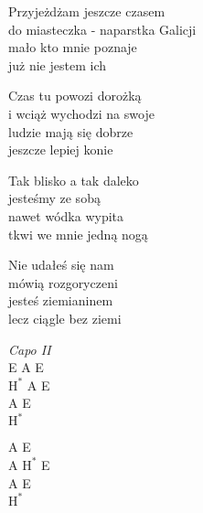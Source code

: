 \begin{text}
    \chordfill
    Przyjeżdżam jeszcze czasem\\
    do miasteczka - naparstka Galicji\\
    mało kto mnie poznaje\\
    już nie jestem ich

    Czas tu powozi dorożką\\
    i wciąż wychodzi na swoje\\
    ludzie mają się dobrze\\
    jeszcze lepiej konie

    Tak blisko a tak daleko\\
    jesteśmy ze sobą\\
    nawet wódka wypita\\
    tkwi we mnie jedną nogą

    Nie udałeś się nam\\
    mówią rozgoryczeni\\
    jesteś ziemianinem\\
    lecz ciągle bez ziemi
\end{text}
\begin{chord}
    \textit{Capo II}\\
    E A E\\
    $\mathrm{H^{*}}$ A E\\
    A E\\
    $\mathrm{H^{*}}$

    A E\\
    A $\mathrm{H^{*}}$ E\\
    A E\\
    $\mathrm{H^{*}}$
\end{chord}
